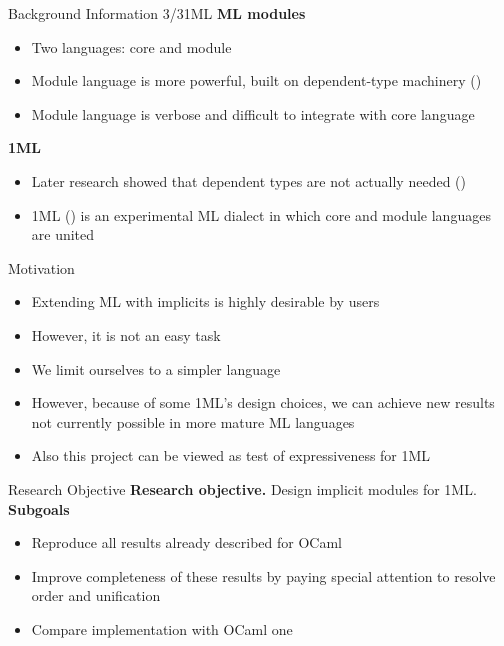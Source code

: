 \documentclass{beamer}
\begin{document}
\begin{frame}{Background Information 3/3}{1ML}
\textbf{ML modules}
\begin{itemize}
    \item Two languages: core and module
    \item Module language is more powerful, built on dependent-type machinery (\cite{dependent_types})
    \item Module language is verbose and difficult to integrate with core language
\end{itemize}
\textbf{1ML}
\begin{itemize}
    \item Later research showed that dependent types are not actually needed (\cite{fing})
    \item 1ML (\cite{1ml}) is an experimental ML dialect in which core and module languages are united
\end{itemize}
\end{frame}

\begin{frame}{Motivation}
\begin{itemize}
    \item Extending ML with implicits is highly desirable by users
    \item However, it is not an easy task
    \item We limit ourselves to a simpler language
    \item However, because of some 1ML's design choices, we can achieve new results not currently possible in more mature ML languages
    \item Also this project can be viewed as test of expressiveness for 1ML
\end{itemize}
\end{frame}

\begin{frame}{Research Objective}
\textbf{Research objective.} 
Design implicit modules for 1ML.
\textbf{Subgoals}
\begin{itemize}
    \item Reproduce all results already described for OCaml
    \item Improve completeness of these results by paying special attention to resolve order and unification
    \item Compare implementation with OCaml one
\end{itemize}
\end{frame}
\end{document}
